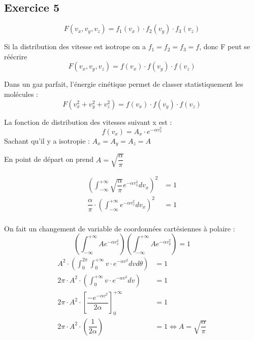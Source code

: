 \documentclass[12pt,a4paper]{report}
\author{Malo Kerebel}
\begin{document}
\subsection{Exercice 5}

\[
	F(v_x, v_y, v_z) = f_1(v_x) \cdot f_2(v_y) \cdot f_3(v_z)
\]

Si la distribution des vitesse est isotrope on a \(f_1 = f_2 = f_3 = f\), donc F peut se réécrire
\[
	F(v_x, v_y, v_z) = f(v_x) \cdot f(v_y) \cdot f(v_z)
\]

Dans un gaz parfait, l'énergie cinétique permet de classer statistiquement les molécules :
\[
	F(v^2_x + v^2_y + v^2_z) = f(v_x) \cdot f(v_y) \cdot f(v_z)
\]

La fonction de distribution des vitesses suivant x est :
\[
	f(v_x) = A_x \cdot e^{-\alpha v_x^2}
\]
Sachant qu'il y a isotropie : \(A_x = A_y = A_z = A\)

En point de départ on prend \(A = \sqrt{\dfrac{\alpha}{\pi}}\)

\begin{align*}
	\left( \int_{-\infty}^{+\infty} \sqrt{\dfrac{\alpha}{\pi}} e^{-\alpha v_x^2} dv_x\right)^2 &= 1\\
	\dfrac{\alpha}{\pi} \cdot \left( \int_{-\infty}^{+\infty} e^{-\alpha v_x^2} dv_x\right)^2 &= 1\\
\end{align*}

On fait un changement de variable de coordonnées cartésiennes à polaire :
\[
	\left( \int_{-\infty}^{+\infty} A e^{-\alpha v_x^2}\right) \left( \int_{-\infty}^{+\infty} A e^{-\alpha v_y^2} \right) = 1
\]
\begin{align*}
	A^2 \cdot \left( \int_0^{2\pi} \int_0^{+\infty} v \cdot e^{-\alpha v^2} dv d\theta \right) &= 1\\
	2\pi \cdot A^2 \cdot \left( \int_0^{+\infty} v \cdot e^{-\alpha v^2} dv \right) &= 1\\
	2\pi \cdot A^2 \cdot \left[ \dfrac{-e^{-\alpha v^2}}{2\alpha} \right]_0^{+\infty} &= 1\\
	2\pi \cdot A^2 \cdot \left( \dfrac{1}{2\alpha}\right) &= 1 \Leftrightarrow A =  \sqrt{\dfrac{\alpha}{\pi}}
\end{align*}
\end{document}
